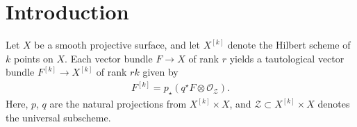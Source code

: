 \section{Introduction}Let $X$ be a smooth projective surface, and let $X^{[k]}$ denote the Hilbert scheme of $k$ points on $X$. Each vector bundle $F\to X$ of rank $r$ yields a tautological vector bundle $F^{[k]}\to X^{[k]}$ of rank $rk$ given by \vspace{-.5ex}
\begin{gather*}
F^{[k]}=p_{\star} (q^{\star} F\otimes \mathcal O_{\mathcal Z}).
\end{gather*}
Here, $p$, $q$ are the natural projections from $X^{[k]}\times X$, and $\mathcal Z\subset X^{[k]}\times X$ denotes the universal subscheme.
